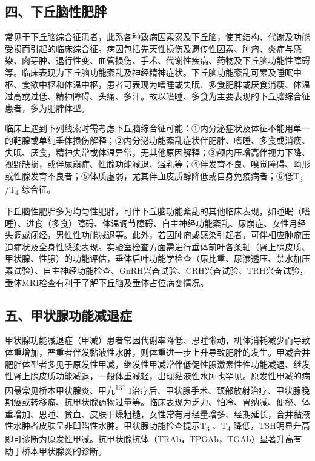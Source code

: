 \subsection{四、下丘脑性肥胖}

常见于下丘脑综合征患者，此系各种致病因素累及下丘脑，使其结构、代谢及功能受损而引起的临床综合征。病因包括先天性损伤及遗传性因素、肿瘤、炎症与感染、肉芽肿、退行性变、血管损伤、手术、代谢性疾病、药物及下丘脑功能性障碍等。临床表现为下丘脑功能紊乱及神经精神症状。下丘脑功能紊乱可累及睡眠中枢、食欲中枢和体温中枢，患者可表现为嗜睡或失眠、多食肥胖或厌食消瘦、体温过高或过低、精神障碍、头痛、多汗。故以嗜睡、多食为主要表现的下丘脑综合征患者，多为肥胖体型。

临床上遇到下列线索时需考虑下丘脑综合征可能：①内分泌症状及体征不能用单一的靶腺或单纯垂体损伤解释；②内分泌功能紊乱症状伴肥胖、嗜睡、多食或消瘦、失眠、厌食，精神失常或体温异常，无其他原因解释；③颅内压增高伴视力下降、视野缺损，或伴尿崩症、性腺功能减退、溢乳等；④伴发育不良、嗅觉障碍、畸形或性腺发育不良者；⑤体质虚弱，尤其伴血皮质醇降低或自身免疫病者；⑥低T\textsubscript{3}
/T\textsubscript{4} 综合征。

下丘脑性肥胖多为均匀性肥胖，可伴下丘脑功能紊乱的其他临床表现，如睡眠（嗜睡）、进食（多食）障碍、体温调节障碍、自主神经功能紊乱、尿崩症、女性月经失调或闭经，男性性功能减退等。此外，若因肿瘤或感染引起者，可伴相应肿瘤压迫症状及全身性感染表现。实验室检查方面需进行垂体前叶各条轴（肾上腺皮质、甲状腺、性腺）的功能评估，垂体后叶功能学检查（尿比重、尿渗透压、禁水加压素试验）、自主神经功能检查、GnRH兴奋试验、CRH兴奋试验、TRH兴奋试验，垂体MRI检查有利于了解下丘脑及垂体占位病变情况。

\subsection{五、甲状腺功能减退症}

甲状腺功能减退症（甲减）患者常因代谢率降低、思睡懒动，机体消耗减少而导致体重增加，严重者伴发黏液性水肿，则体重进一步上升导致肥胖的发生。甲减合并肥胖体型者多见于原发性甲减，继发性甲减常伴低促性腺激素性性功能减退、继发性肾上腺皮质功能减退，一般体重减轻，出现黏液性水肿也罕见。原发性甲减的病因最常见桥本甲状腺炎、甲亢\textsuperscript{131}
I治疗后、甲状腺手术、颈部放射治疗、甲状腺晚期癌或转移瘤、抗甲状腺药物过量等。临床表现为乏力、怕冷、胃纳减、便秘、体重增加、思睡、贫血、皮肤干燥粗糙，女性常有月经量增多、经期延长，合并黏液性水肿者皮肤呈非凹陷性水肿。甲状腺功能检查提示T\textsubscript{3}
、T\textsubscript{4}
降低，TSH明显升高即可诊断为原发性甲减。抗甲状腺抗体（TRAb，TPOAb，TGAb）显著升高有助于桥本甲状腺炎的诊断。

